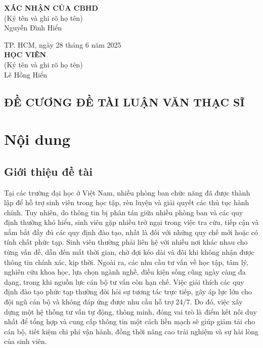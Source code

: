 \documentclass[a4paper,12pt]{article}
\begin{document}
\begin{center}
    \begin{minipage}{0.46\textwidth}
        \raggedright
        \centering
        \vspace{1.1em}
        \textbf{XÁC NHẬN CỦA CBHD} \\
        (Ký tên và ghi rõ họ tên) \\
        \vspace{5em}
        Nguyễn Đình Hiển \\
    \end{minipage}
    \hfill
    \begin{minipage}{0.46\textwidth}
        \raggedleft
        \centering
        TP. HCM, ngày 28 tháng 6 năm 2025 \\
        \textbf{HỌC VIÊN} \\
        (Ký tên và ghi rõ họ tên) \\
        \vspace{5em}
        Lê Hồng Hiển \\
    \end{minipage}
\end{center}


\newpage

\begin{center}
    \section*{ĐỀ CƯƠNG ĐỀ TÀI LUẬN VĂN THẠC SĨ}
\end{center}

\section{Nội dung}

\subsection{Giới thiệu đề tài}

Tại các trường đại học ở Việt Nam, nhiều phòng ban chức năng đã được thành lập để hỗ trợ sinh viên trong học tập, rèn luyện và giải quyết các thủ tục hành chính.
Tuy nhiên, do thông tin bị phân tán giữa nhiều phòng ban và các quy định thường khó hiểu, sinh viên gặp nhiều trở ngại trong việc tra cứu, tiếp cận và nắm bắt đầy đủ các quy định đào tạo, nhất là đối với những quy chế mới hoặc có tính chất phức tạp.
Sinh viên thường phải liên hệ với nhiều nơi khác nhau cho từng vấn đề, dẫn đến mất thời gian, chờ đợi kéo dài và đôi khi không nhận được thông tin chính xác, kịp thời.
Ngoài ra, các nhu cầu tư vấn về học tập, tâm lý, nghiên cứu khoa học, lựa chọn ngành nghề, điều kiện sống cũng ngày càng đa dạng, trong khi nguồn lực cán bộ tư vấn còn hạn chế.
Việc giải thích các quy định đào tạo phức tạp thường đòi hỏi sự tương tác trực tiếp, gây áp lực lớn cho đội ngũ cán bộ và không đáp ứng được nhu cầu hỗ trợ 24/7.
Do đó, việc xây dựng một hệ thống tư vấn tự động, thông minh, đóng vai trò là điểm kết nối duy nhất để tổng hợp và cung cấp thông tin một cách liền mạch sẽ giúp giảm tải cho cán bộ, tiết kiệm chi phí vận hành, đồng thời nâng cao trải nghiệm và sự hài lòng của sinh viên.
\end{document}
